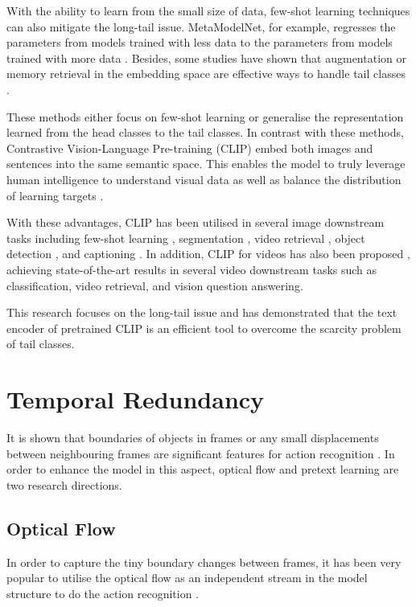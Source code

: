 With the ability to learn from the small size of data, few-shot learning techniques can also mitigate the long-tail issue. MetaModelNet, for example, regresses the parameters from models trained with less data to the parameters from models trained with more data \parencite{NIPS2017_147ebe63}. Besides, some studies have shown that augmentation or memory retrieval in the embedding space are effective ways to handle tail classes \parencite{liu2019large, Zhu_2020_CVPR, li2021metasaug, Fu_2022_ACCV}.

These methods either focus on few-shot learning or generalise the representation learned from the head classes to the tail classes. In contrast with these methods, Contrastive Vision-Language Pre-training (CLIP) \parencite{radford2021learning} embed both images and sentences into the same semantic space. This enables the model to truly leverage human intelligence to understand visual data as well as balance the distribution of learning targets \parencite{ma2022x}. 

With these advantages, CLIP has been utilised in several image downstream tasks including few-shot learning \parencite{zhang2022tip}, segmentation \parencite{wang2022cris}, video retrieval \parencite{ma2022x}, object detection \parencite{lin2023gridclip}, and captioning \parencite{mokady2021clipcap}. In addition, CLIP for videos has also been proposed \parencite{xu-etal-2021-videoclip, wang2022internvideo}, achieving state-of-the-art results in several video downstream tasks such as classification, video retrieval, and vision question answering.

This research focuses on the long-tail issue and has demonstrated that the text encoder of pretrained CLIP is an efficient tool to overcome the scarcity problem of tail classes.


\section{Temporal Redundancy}
It is shown that boundaries of objects in frames or any small displacements between neighbouring frames are significant features for action recognition \parencite{10.1007/978-3-030-12939-2_20}. In order to enhance the model in this aspect, optical flow and pretext learning are two research directions. 

\subsection{Optical Flow}
In order to capture the tiny boundary changes between frames, it has been very popular to utilise the optical flow as an independent stream in the model structure to do the action recognition \parencite{Piergiovanni_2019_CVPR}. 

